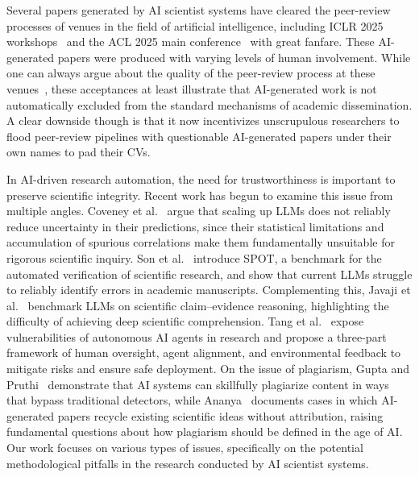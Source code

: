 \documentclass[10pt]{article}
\begin{document}
Several papers generated by AI scientist systems have cleared the peer-review processes of venues in the field of artificial intelligence, including ICLR 2025 workshops~\citep{yamada2025aiscientistv2workshoplevelautomated, autoscience2025carl} and the ACL 2025 main conference~\citep{zochi2025} with great fanfare. These AI-generated papers were produced with varying levels of human involvement. While one can always argue about the quality of the peer-review process at these venues~\citep[Section ``Peer-review objectives'']{shah2021survey}, these acceptances at least illustrate that AI-generated work is not automatically excluded from the standard mechanisms of academic dissemination. A clear downside though is that it now incentivizes unscrupulous researchers to flood peer-review pipelines with questionable AI-generated papers under their own names to pad their CVs.

In AI-driven research automation, the need for trustworthiness is important to preserve scientific integrity. Recent work has begun to examine this issue from multiple angles. Coveney et al.~\citep{coveney2025wall} argue that scaling up LLMs does not reliably reduce uncertainty in their predictions, since their statistical limitations and accumulation of spurious correlations make them fundamentally unsuitable for rigorous scientific inquiry. Son et al.~\citep{son2025ai} introduce SPOT, a benchmark for the automated verification of scientific research, and show that current LLMs struggle to reliably identify errors in academic manuscripts. Complementing this, Javaji et al.~\citep{javaji2025aivalidatesciencebenchmarking} benchmark LLMs on scientific claim–evidence reasoning, highlighting the difficulty of achieving deep scientific comprehension. Tang et al.~\citep{tangrisks} expose vulnerabilities of autonomous AI agents in research and propose a three-part framework of human oversight, agent alignment, and environmental feedback to mitigate risks and ensure safe deployment. On the issue of plagiarism, Gupta and Pruthi~\citep{gupta2025all} demonstrate that AI systems can skillfully plagiarize content in ways that bypass traditional detectors, while Ananya~\citep{Ananya2025PlagiarismAI} documents cases in which AI-generated papers recycle existing scientific ideas without attribution, raising fundamental questions about how plagiarism should be defined in the age of AI. Our work focuses on various types of issues, specifically on the potential methodological pitfalls in the research conducted by AI scientist systems. 
\end{document}
